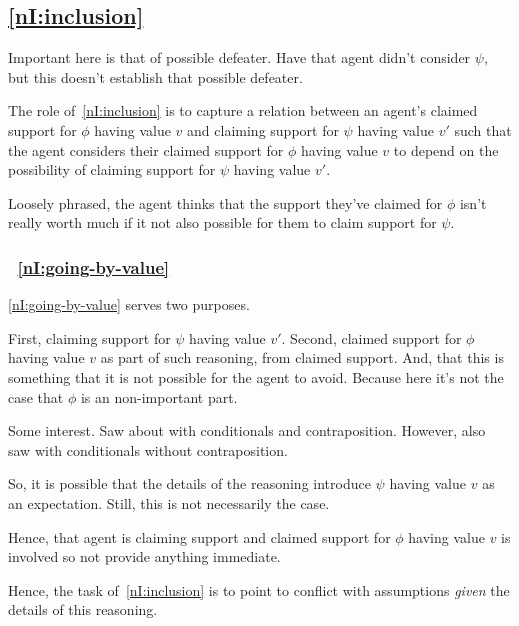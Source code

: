 \subsection{\ref{nI:inclusion}}

\begin{note}
  Important here is that of possible defeater.
  Have that agent didn't consider \(\psi\), but this doesn't establish that possible defeater.
\end{note}

\begin{note}
  The role of~\ref{nI:inclusion} is to capture a relation between an agent's claimed support for \(\phi\) having value \(v\) and claiming support for \(\psi\) having value \(v'\) such that the agent considers their claimed support for \(\phi\) having value \(v\) to depend on the possibility of claiming support for \(\psi\) having value \(v'\).

  Loosely phrased, the agent thinks that the support they've claimed for \(\phi\) isn't really worth much if it not also possible for them to claim support for \(\psi\).
\end{note}



\subsubsection{~\ref{nI:going-by-value}}

\begin{note}
  \ref{nI:going-by-value} serves two purposes.

  First, claiming support for \(\psi\) having value \(v'\).
  Second, claimed support for \(\phi\) having value \(v\) as part of such reasoning, from claimed support.
  And, that this is something that it is not possible for the agent to avoid.
  {
    \color{red} Because here it's not the case that \(\phi\) is an non-important part.
  }

  Some interest.
  Saw about with conditionals and contraposition.
  However, also saw with conditionals without contraposition.

  So, it is possible that the details of the reasoning introduce \(\psi\) having value \(v\) as an expectation.
  Still, this is not necessarily the case.

  Hence, that agent is claiming support and claimed support for \(\phi\) having value \(v\) is involved so not provide anything immediate.

  Hence, the task of~\ref{nI:inclusion} is to point to conflict with assumptions \emph{given} the details of this reasoning.
\end{note}

